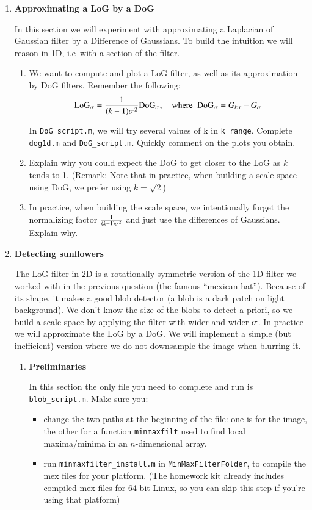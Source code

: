 \begin{enumerate}
\item \textbf{Approximating a LoG by a DoG}

  In this section we will experiment with approximating a Laplacian of Gaussian filter by a Difference of Gaussians. To build the intuition we will reason in 1D, i.e\ with a section of the filter. %
  \begin{enumerate}
  \item {} We want to compute and plot a LoG filter, as well as its approximation by DoG filters. Remember the following:
  $$\text{LoG}_{\sigma} = \frac{1}{(k-1)\sigma^2}\text{DoG}_{\sigma},\quad \text{where }\; \text{DoG}_{\sigma} = G_{k\sigma} - G_{\sigma}$$
  
  In \verb!DoG_script.m!, we will try several values of k in \verb!k_range!. Complete \verb!dog1d.m! and \verb!DoG_script.m!. Quickly comment on the plots you obtain.

  \item {} Explain why you could expect the DoG to get closer to the LoG as $k$ tends to 1. (Remark: Note that in practice, when building a scale space using DoG, we prefer using $k=\sqrt{2}$)
  \item {} In practice, when building the scale space, we intentionally forget the normalizing factor $\frac{1}{(k-1)\sigma^2}$ and just use the differences of Gaussians. Explain why.
  \end{enumerate}

  
\item \textbf{Detecting sunflowers}

  The LoG filter in 2D is a rotationally symmetric version of the 1D filter we worked with in the previous question (the famous ``mexican hat''). Because of its shape, it makes a good blob detector (a blob is a dark patch on light background). We don't know the size of the blobs to detect a priori, so we build a scale space by applying the filter with wider and wider $\sigma$. In practice we will approximate the LoG by a DoG. We will implement a simple (but inefficient) version where we do not downsample the image when blurring it.


  \begin{enumerate}
\item \textbf{Preliminaries}

  In this section the only file you need to complete and run is \verb!blob_script.m!. Make sure you:
  \begin{itemize}
  \item change the two paths at the beginning of the file: one is for the image, the other for a function \verb!minmaxfilt! used to find local maxima/minima in an $n$-dimensional array.
  \item run \verb!minmaxfilter_install.m! in \verb!MinMaxFilterFolder!, to compile the mex files for your platform. (The homework kit already includes compiled mex files for 64-bit Linux, so you can skip this step if you're using that platform)
  \end{itemize}


\end{enumerate}
\end{enumerate}
